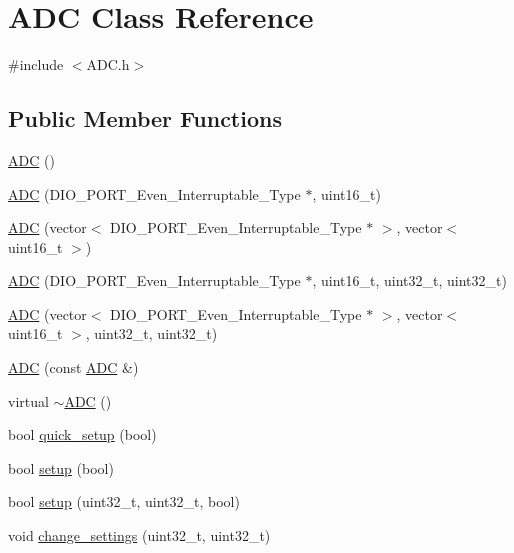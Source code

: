 \hypertarget{class_a_d_c}{}\section{A\+DC Class Reference}
\label{class_a_d_c}


{\ttfamily \#include $<$A\+D\+C.\+h$>$}

\subsection*{Public Member Functions}
\begin{DoxyCompactItemize}
\item 
\hyperlink{class_a_d_c_a60b6e21403b1f30984f63832c0562960}{A\+DC} ()
\item 
\hyperlink{class_a_d_c_af40d5d1525b1eba51de9786a103197db}{A\+DC} (D\+I\+O\+\_\+\+P\+O\+R\+T\+\_\+\+Even\+\_\+\+Interruptable\+\_\+\+Type $\ast$, uint16\+\_\+t)
\item 
\hyperlink{class_a_d_c_a6e225179130905bc77b5f331bbe9b928}{A\+DC} (vector$<$ D\+I\+O\+\_\+\+P\+O\+R\+T\+\_\+\+Even\+\_\+\+Interruptable\+\_\+\+Type $\ast$ $>$, vector$<$ uint16\+\_\+t $>$)
\item 
\hyperlink{class_a_d_c_a383dcb0d6e72dec09af98be3c50ce5b8}{A\+DC} (D\+I\+O\+\_\+\+P\+O\+R\+T\+\_\+\+Even\+\_\+\+Interruptable\+\_\+\+Type $\ast$, uint16\+\_\+t, uint32\+\_\+t, uint32\+\_\+t)
\item 
\hyperlink{class_a_d_c_aa50e3631ffae7f96d2086ef38f0aa21c}{A\+DC} (vector$<$ D\+I\+O\+\_\+\+P\+O\+R\+T\+\_\+\+Even\+\_\+\+Interruptable\+\_\+\+Type $\ast$ $>$, vector$<$ uint16\+\_\+t $>$, uint32\+\_\+t, uint32\+\_\+t)
\item 
\hyperlink{class_a_d_c_a15176bd0348a3ba2869c44ea219fccc8}{A\+DC} (const \hyperlink{class_a_d_c}{A\+DC} \&)
\item 
virtual \hyperlink{class_a_d_c_aefd878291d0c14aa524df99af5a63148}{$\sim$\+A\+DC} ()
\item 
bool \hyperlink{class_a_d_c_a1383abad290f93a62058e1855dc096f0}{quick\+\_\+setup} (bool)
\item 
bool \hyperlink{class_a_d_c_a2a94fbf79a88a67299e0b080cfa03b5b}{setup} (bool)
\item 
bool \hyperlink{class_a_d_c_a2ade3f99ab4f731bc8f9e26c98477df3}{setup} (uint32\+\_\+t, uint32\+\_\+t, bool)
\item 
void \hyperlink{class_a_d_c_a74df33830f6ddcd4ba6b0502bddce2bf}{change\+\_\+settings} (uint32\+\_\+t, uint32\+\_\+t)
\item 

\end{DoxyCompactItemize}
